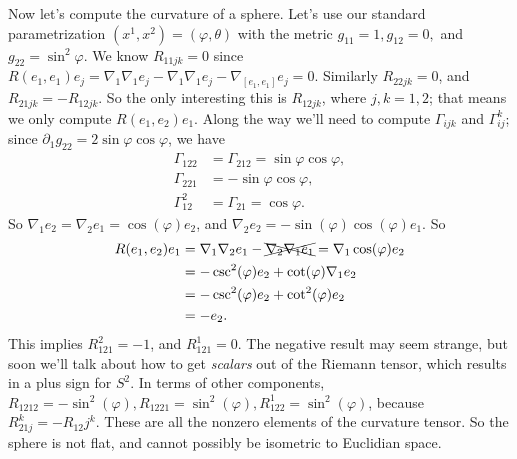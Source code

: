\begin{example}
    Now let's compute the curvature of a sphere. Let's use our standard parametrization $(x^1,x^2)=(\varphi ,\theta)$ with the metric $g_{11}=1,g_{12}=0,$ and $g_{22}=\sin ^2\varphi $. We know $R_{11jk}=0$ since $R(e_1,e_1)e_j =\nabla_1\nabla_1e_j -\nabla_1\nabla_1e_j -\nabla_{[e_1,e_1]}e_j =0$. Similarly $R_{22jk}=0$, and $R_{21jk}=-R_{12jk}$. So the only interesting this is $R_{12jk}$, where $j,k=1,2$; that means we only compute $R(e_1 ,e_2 )e_1$. Along the way we'll need to compute $\Gamma _{ijk}$ and $\Gamma _{ij}^k$; since $\partial_1g_{22}=2 \sin \varphi  \cos \varphi  $, we have
    \begin{align*}
        \Gamma _{122}&=\Gamma _{212}=\sin \varphi  \cos \varphi ,\\
        \Gamma _{221}&=-\sin \varphi  \cos \varphi ,\\
        \Gamma _{12}^2&=\Gamma _{21}= \cos \varphi .
    \end{align*}So $\nabla_1e_2=\nabla_2e_1=\cos (\varphi ) e_2$, and $\nabla_2e_2=- \sin (\varphi ) \cos (\varphi)  e_1$. So 
    \begin{align*}
        R(e_1,e_2)e_1&=\nabla_1\nabla_2e_1-\xcancel{ \nabla_2\nabla_1e_1}=\nabla_1 \cos (\varphi )e_2\\
                     &=- \csc ^2(\varphi )e_2+\cot (\varphi )\nabla_1e_2\\
                     &=-\csc ^2(\varphi )e_2+\cot ^2(\varphi )e_2\\
                     &=-e_2.
    \end{align*}This implies $R_{121}^2=-1$, and $R_{121}^1=0$. The negative result may seem strange, but soon we'll talk about how to get \emph{scalars} out of the Riemann tensor, which results in a plus sign for $S^2$. In terms of other components, $R_{1212}=-\sin ^2 (\varphi ), R_{1221}=\sin ^2(\varphi ),R_{122}^1=\sin ^2 (\varphi )$, because $R_{21j}^k=-R_{12}j^k$. These are all the nonzero elements of the curvature tensor. So the sphere is not flat, and cannot possibly be isometric to Euclidian space.
\end{example}

